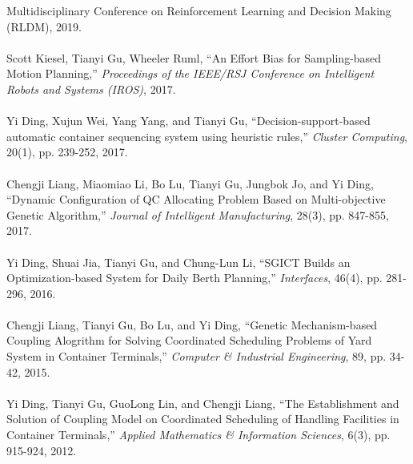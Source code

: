 \documentclass[margin, 10pt]{res} %
\begin{document}
\begin{resume}
{Multidisciplinary Conference on Reinforcement Learning and Decision
Making (RLDM)}, 2019.\\~\\
Scott Kiesel, Tianyi Gu, Wheeler Ruml, ``An Effort Bias for
Sampling-based Motion Planning,'' {\sl Proceedings of the IEEE/RSJ Conference on
  Intelligent Robots and Systems (IROS)}, 2017.\\~\\
Yi Ding, Xujun Wei, Yang Yang, and Tianyi Gu, 
``Decision-support-based automatic container sequencing system using
heuristic rules,'' {\sl Cluster Computing}, 20(1), pp. 239-252, 2017.\\~\\
Chengji Liang, Miaomiao Li, Bo Lu, Tianyi Gu, Jungbok Jo, and Yi Ding,
``Dynamic Configuration of QC Allocating Problem Based on
Multi-objective Genetic Algorithm,'' {\sl Journal of Intelligent
  Manufacturing}, 28(3), pp. 847-855, 2017.\\~\\
Yi Ding, Shuai Jia, Tianyi Gu, and Chung-Lun Li, ``SGICT Builds an Optimization-based System for Daily Berth Planning,'' {\sl Interfaces}, 46(4), pp. 281-296, 2016.\\~\\
Chengji Liang, Tianyi Gu, Bo Lu, and Yi Ding, ``Genetic Mechanism-based Coupling Alogrithm for Solving Coordinated Scheduling Problems of Yard System in Container Terminals,'' {\sl Computer \& Industrial Engineering}, 89, pp. 34-42, 2015.\\~\\
Yi Ding, Tianyi Gu, GuoLong Lin, and Chengji Liang, ``The
Establishment and Solution of Coupling Model on Coordinated Scheduling
of Handling Facilities in Container Terminals,'' {\sl Applied
  Mathematics \& Information Sciences}, 6(3), pp. 915-924,
2012.

\end{resume}
\end{document}

